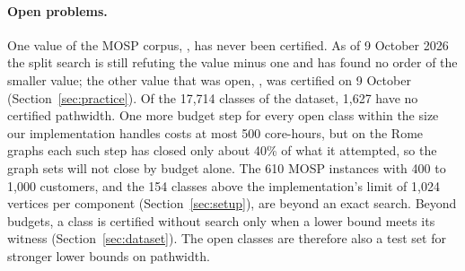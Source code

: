 \paragraph{Open problems.} One value of the MOSP corpus,
, has never been certified. As of 9 October 2026 the
split search is still refuting the value minus one and has found no order of
the smaller value; the other value that was open, ,
was certified on 9 October (Section~\ref{sec:practice}). Of the 17,714 classes of the dataset, 1,627 have
no certified pathwidth. One more budget step for every open class within the
size our implementation handles costs at most 500 core-hours, but on the Rome graphs each such step has closed only about
40\% of what it attempted, so the graph sets will not close by budget alone.
The 610 MOSP instances with 400 to 1,000 customers, and the 154 classes above
the implementation's limit of 1,024 vertices per component
(Section~\ref{sec:setup}), are beyond an exact search. Beyond budgets, a class is certified without search
only when a lower bound meets its witness (Section~\ref{sec:dataset}). The
open classes are therefore also a test set for stronger lower bounds on
pathwidth.
